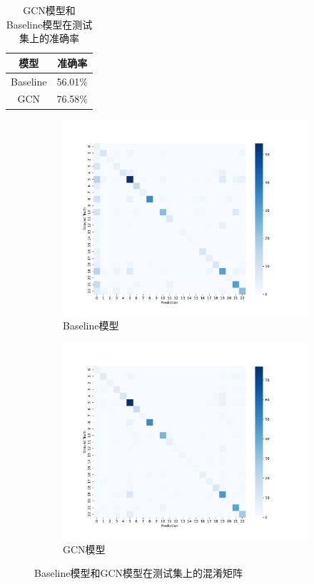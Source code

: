 \begin{table}[htbp]
    \centering
    \caption{GCN模型和Baseline模型在测试集上的准确率}
    \begin{tabular}{cc}
        \toprule
        模型 & 准确率 \\
        \midrule
        Baseline & 56.01\% \\
        GCN & 76.58\% \\
        \bottomrule
    \end{tabular}
    \label{tab:gcn_acc}
\end{table}
\begin{figure}[htbp]
    \centering
    \begin{subfigure}{0.49\textwidth}
        \centering
        \includegraphics[width=\textwidth]{confusion_matrix_baseline.pdf}
        \caption{Baseline模型}
    \end{subfigure}
    \begin{subfigure}{0.49\textwidth}
        \centering
        \includegraphics[width=\textwidth]{confusion_matrix_gnn.pdf}
        \caption{GCN模型}
    \end{subfigure}
    \caption{Baseline模型和GCN模型在测试集上的混淆矩阵}
    \label{tab:gcn_confusion}
\end{figure}

